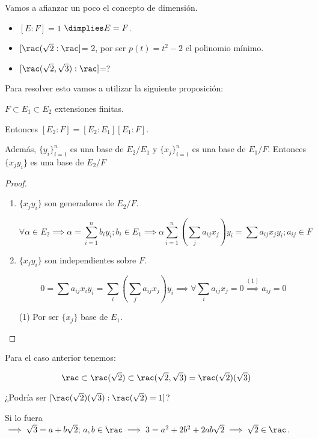 \documentclass{apuntes}
\begin{document}
Vamos a afianzar un poco el concepto de dimensión. 
\begin{example}
\begin{itemize}
\item $[E:F] = 1$ $\dimplies E=F$.
\item $[\rac(\sqrt{2} : \rac]$= 2, por ser $p(t) = t^2 -2$ el polinomio mínimo.
\item $[\rac (\sqrt{2},\sqrt{3}) %
:\rac]$=?
\end{itemize}
\end{example}

Para resolver esto vamos a utilizar la siguiente proposición:

\begin{prop}
$F \subset E_1 \subset E_2$ extensiones finitas.

Entonces $[E_2 : F] = [E_2 : E_1][E_1 : F]$.

Además, $\{y_i\}_{i=1}^n$ es una base de $E_2 / E_1$ y $\{x_j\}_{i=1}^n$  es una base de $E_1 / F$. Entonces $\{x_jy_i\}$ es una base de $E_2/F$
\end{prop}

\begin{proof}
\begin{enumerate}
\item $\{x_jy_i\}$ son generadores de $E_2 / F$.

$$\forall \alpha \in E_2 \implies \alpha = \sum_{i=1}^n b_iy_i; b_i\in E_1 \implies \alpha \sum_{i=1}^n \left(\sum_j a_{ij}x_j\right) y_i = \sum a_{ij}x_jy_i; a_{ij}\in F$$

\item $\{x_jy_i\}$ son independientes sobre $F$.

\[0 = \sum a_{ij}x_iy_i = \sum_i \left(\sum_j a_{ij}x_j\right)y_i \implies \forall \sum_i a_{ij}x_j = 0 \overset{(1)}{\implies} a_{ij} = 0
\]

(1) Por ser $\{x_j\}$ base de $E_1$.
\end{enumerate}
\end{proof}


Para el caso anterior tenemos:

\[
\rac \subset \rac(\sqrt{2}) \subset \rac(\sqrt{2},\sqrt{3}) = \rac(\sqrt{2})(\sqrt{3})
\]

¿Podría ser $[\rac(\sqrt{2})(\sqrt{3}): \rac(\sqrt{2}) = 1 ]$?

Si lo fuera $\implies \sqrt{3} = a+b\sqrt{2} ;\, a,b\in\rac \implies 3=a^2+2b^2+2ab\sqrt{2} \implies \sqrt{2}\in \rac$.
\end{document}
